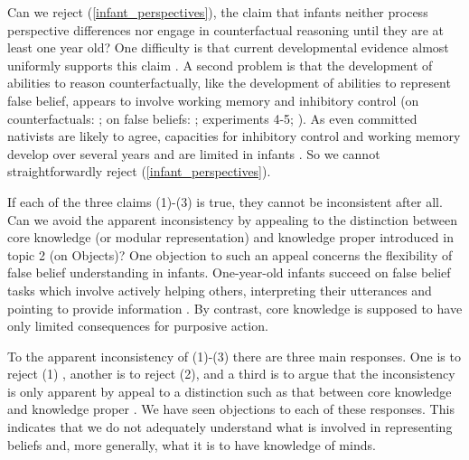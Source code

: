 \documentclass[12pt,\papersize]{extarticle}
\begin{document}
Can we reject (\ref{infant_perspectives}), the claim that infants neither process perspective differences nor engage in counterfactual reasoning until they are at least one year old?
One difficulty is that current developmental evidence almost uniformly supports this claim  \citep{rafetseder:2010_counterfactual,beck:2011_almost}.
A second problem is that the development of abilities to reason counterfactually,
like the development of abilities to represent false belief,
appears to involve working memory and inhibitory control 
(on counterfactuals: 
	\citealp{drayton:2011_counterfactual,beck:2011_supporting};
on false beliefs: \citealp{apperly:2008_back, Apperly:2009cc}; \citealp{lin:2010_reflexively, McKinnon:2007rr} experiments 4-5; \citealp{saxe_reading_2006}).
As even committed nativists are likely to agree, capacities for inhibitory control and working memory develop over several years and are limited in infants \citep[e.g.][]{carlson:2005_developmentally}.
So we cannot straightforwardly reject (\ref{infant_perspectives}).



If each of the three claims (1)-(3) is true, they cannot be inconsistent after all. 
Can we avoid the apparent inconsistency by appealing to the distinction between core knowledge (or modular representation) and knowledge proper introduced in topic 2 (on Objects)?  
One objection to such an appeal concerns the flexibility of false belief understanding in infants.
One-year-old infants succeed on false belief tasks which involve actively helping others, interpreting their utterances and pointing to provide information \citep{Buttelmann:2009gy,Knudsen:2011fk,southgate:2010fb}. 
By contrast, core knowledge is supposed to have only limited consequences for purposive action.

To the apparent inconsistency of (1)-(3) there are three main responses.
One is to reject (1) \citep[e.g.][]{Perner:2005hq}, 
another is to reject (2),
 and a third is to argue that the inconsistency is only apparent by appeal to a distinction such as that between core knowledge and knowledge proper \citep[e.g.][]{Clements:1994cw,low:2010_preschoolers}.
We have seen objections to each of these responses.
This indicates that we do not adequately understand what is involved in representing beliefs and, more generally, what it is to have %
knowledge of minds.
\end{document}
